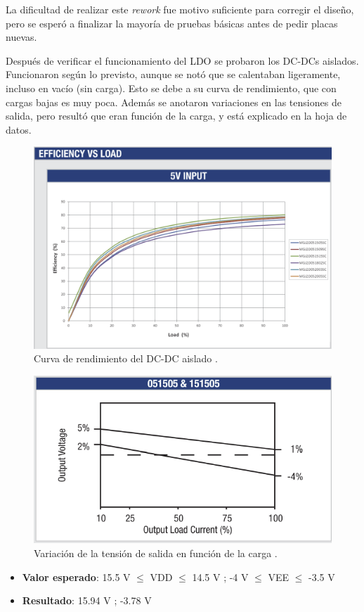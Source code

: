La dificultad de realizar este \textit{rework} fue motivo suficiente para corregir el diseño, pero se esperó a finalizar la mayoría de pruebas básicas antes de pedir placas nuevas.

Después de verificar el funcionamiento del LDO se probaron los DC-DCs aislados. Funcionaron según lo previsto, aunque se notó que se calentaban ligeramente, incluso en vacío (sin carga). Esto se debe a su curva de rendimiento, que con cargas bajas es muy poca. Además se anotaron variaciones en las tensiones de salida, pero resultó que eran función de la carga, y está explicado en la hoja de datos.

\begin{figure}[H]
	\centering
	\includegraphics[width=0.7\linewidth]{fig/DCDC-eff}
	\caption{Curva de rendimiento del DC-DC aislado \cite{MurataDCDC}.}
\end{figure}

\begin{figure}[H]
	\centering
	\includegraphics[width=0.7\linewidth]{fig/DCDC-eff1}
	\caption{Variación de la tensión de salida en función de la carga \cite{MurataDCDC}.}
\end{figure}

\begin{itemize}
	\item \textbf{Valor esperado}: 15.5 V $\le$ VDD $\le$ 14.5 V ; -4 V $\le$ VEE $\le$ -3.5 V
	\item \textbf{Resultado}: 15.94 V ; -3.78 V
\end{itemize}


